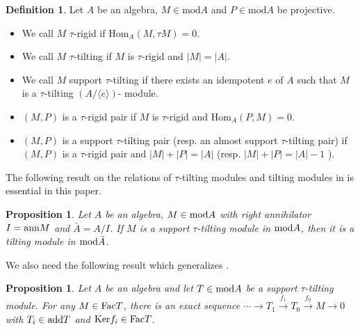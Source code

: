 \documentclass[a4paper]{amsart}
\newtheorem{prop}[thm]{Proposition}
\theoremstyle{definition}
\newtheorem{defn}[thm]{Definition}
\theoremstyle{remark}
\numberwithin{equation}{section}
\begin{document}
\begin{defn}\label{2.5} Let $A$ be an algebra, $M\in{\text{mod}A}$ and $P\in\text{mod}A$ be projective.
\begin{itemize}
  \item [(1)]  We call $M$ $\tau$-rigid if $\text{Hom}_A(M,\tau M)=0$.

 \item [(2)]  We call $M$ $\tau$-tilting if $M$ is $\tau$-rigid and $|M|= |A|$.

 \item [(3)]  We call $M$ support $\tau$-tilting if there exists an idempotent $e$ of $A$ such that $M$ is a $\tau$-tilting $(A/\langle e\rangle)$- module.

\item [(4)] $(M, P)$ is a $\tau$-rigid pair if $M$ is $\tau$-rigid and $\text{Hom}_A(P, M)=0$.

\item [(5)]  $(M, P)$ is a  support $\tau$-tilting pair (resp. an almost support $\tau$-tilting pair) if $(M,P)$ is a $\tau$-rigid pair and $|M|+|P|=|A|$ (resp. $|M|+|P|=|A|-1$ ).

 \end{itemize}
\end{defn}

The following result on the relations of $\tau$-tilting modules and tilting modules in \cite[Proposition 2.2]{AIR} is essential in this paper.

\begin{prop}\label{2.12} Let $A$ be an algebra, $M\in{\textup{mod}A}$ with right annihilator $I=\textup{ann} M$ and $\bar{A}=A/I$.
If $M$ is a support $\tau$-tilting module in $\textup{mod}A$, then it is a tilting module in $\textup{mod} \bar{A}$.
\end{prop}


We also need the following result which generalizes \cite[Proposition 2.3]{Z}.

\begin{prop}\label{2.6} Let $A$ be an algebra and let $T\in\textup{mod}A$ be a support $\tau$-tilting module. For any $M\in\textup{Fac}T$, there is an exact sequence $\cdots\rightarrow T_1\stackrel{f_1}{\rightarrow}T_0\stackrel{f_0}{\rightarrow}M\rightarrow 0$ with $T_i\in \textup{add}T$ and $\textup{Ker} f_i\in \textup{Fac}T$.
\end{prop}
\end{document}
